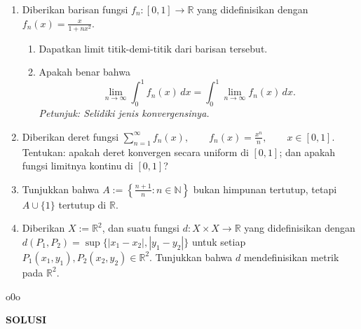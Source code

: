 \documentclass[11pt,letterpaper]{article}
\newcommand{\R}{\mathbb{R}}
\newcommand{\N}{\mathbb{N}}
\begin{document}
\begin{enumerate}
  \item Diberikan barisan fungsi $f_n : [0,1] \to \R$ yang didefinisikan dengan
        $
          f_n(x) = \frac{x}{1+nx^2}.
        $
        \begin{enumerate}
          \item Dapatkan limit titik-demi-titik dari barisan tersebut.
          \item Apakah benar bahwa
                \[
                  \lim_{n\to\infty} \int_0^1 f_n(x)\,dx
                  =
                  \int_0^1 \lim_{n\to\infty} f_n(x)\,dx.
                \]
                \textit{Petunjuk: Selidiki jenis konvergensinya.}
        \end{enumerate}

  \item Diberikan deret fungsi
        $
          \sum_{n=1}^{\infty} f_n(x),
          \qquad
          f_n(x) = \frac{x^n}{n},
          \qquad x \in [0,1].
        $
        Tentukan: apakah deret konvergen secara uniform di $[0,1]$; dan apakah fungsi limitnya kontinu di $[0,1]$?

  \item Tunjukkan bahwa
        $
          A := \left\{\frac{n+1}{n} : n \in \N \right\}
        $
        bukan himpunan tertutup, tetapi $A \cup \{1\}$ tertutup di $\R$.

  \item Diberikan $X := \R^2$, dan suatu fungsi $d : X \times X \to \R$ yang didefinisikan dengan
        $
          d(P_1,P_2) = \sup \{ |x_1-x_2|, |y_1-y_2| \}
        $
        untuk setiap $P_1(x_1,y_1), P_2(x_2,y_2) \in \R^2$. Tunjukkan bahwa $d$ mendefinisikan metrik pada $\R^2$.
\end{enumerate}

\vspace{0.5cm}
\begin{center}
  \raisebox{.5ex}{\rule{0.5cm}{.4pt}}o0o\raisebox{.5ex}{\rule{0.5cm}{.4pt}}
\end{center}

\newpage
\begin{center}
  \textbf{SOLUSI}
\end{center}
\end{document}

